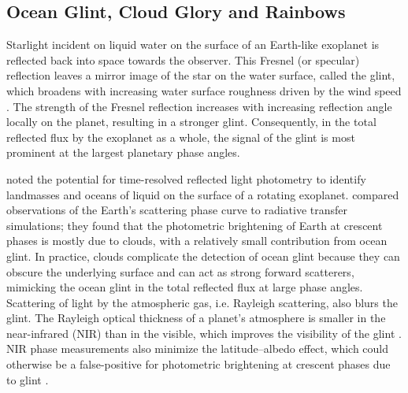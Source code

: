 \documentclass[
    usenatbib,
]{mnras}
\begin{document}

\subsection{Ocean Glint, Cloud Glory and Rainbows}
%
Starlight incident on liquid water on the surface of an Earth-like exoplanet is reflected back into space towards the observer. This Fresnel (or specular) reflection leaves a mirror image of the star on the water surface, called the glint, which broadens with increasing water surface roughness driven by the wind speed \citep{CoxMunk1954}. The strength of the Fresnel reflection increases with increasing reflection angle locally on the planet, resulting in a stronger glint. Consequently, in the total reflected flux by the exoplanet as a whole, the signal of the glint is most prominent at the largest planetary phase angles.

\cite{2001Natur.412..885F} noted the potential for time-resolved reflected 
light photometry to identify landmasses and oceans of liquid on the surface of 
a rotating exoplanet. \cite{2010ApJ...721L..67R} compared observations of the Earth's scattering phase curve to radiative transfer simulations; they found that the photometric brightening of Earth at crescent phases is mostly due to clouds, with a relatively small contribution from ocean glint. In practice, clouds complicate the detection of ocean glint because they can obscure the underlying surface and can act as strong forward scatterers, mimicking the ocean glint in the total reflected flux at large phase angles. Scattering of light by the atmospheric gas, i.e. Rayleigh scattering, also blurs the glint. The Rayleigh optical thickness of a planet's atmosphere is smaller in the near-infrared (NIR) than in the visible, which improves the visibility of the glint \citep{Zugger_2011}. NIR phase measurements also minimize the latitude--albedo effect, which could otherwise be a false-positive for photometric brightening at crescent phases due to glint \citep{2012ApJ...752L...3C}. 

\end{document}
